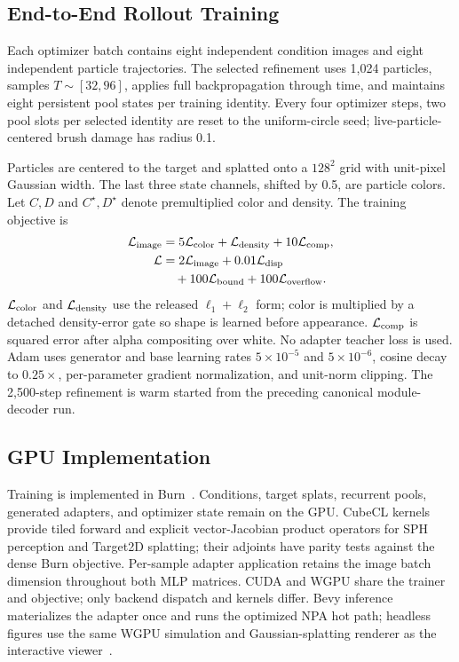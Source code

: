 \documentclass[sigconf,nonacm]{acmart}
\begin{document}
\subsection{End-to-End Rollout Training}

Each optimizer batch contains eight independent condition images and eight
independent particle trajectories. The selected refinement uses 1,024
particles, samples $T\sim[32,96]$, applies full backpropagation through time,
and maintains eight persistent pool states per training identity. Every four
optimizer steps, two pool slots per selected identity are reset to the
uniform-circle seed; live-particle-centered brush damage has radius 0.1.

Particles are centered to the target and splatted onto a $128^2$ grid with
unit-pixel Gaussian width. The last three state channels, shifted by 0.5, are
particle colors. Let $C,D$ and $C^\star,D^\star$ denote premultiplied color and
density. The training objective is
\begin{equation}
\begin{aligned}
\mathcal{L}_{\rm image}
  &=5\mathcal{L}_{\rm color}+\mathcal{L}_{\rm density}
    +10\mathcal{L}_{\rm comp},\\
\mathcal{L}
  &=2\mathcal{L}_{\rm image}+0.01\mathcal{L}_{\rm disp}\\
  &\quad+100\mathcal{L}_{\rm bound}+100\mathcal{L}_{\rm overflow}.
\end{aligned}
\label{eq:loss}
\end{equation}
$\mathcal{L}_{\rm color}$ and $\mathcal{L}_{\rm density}$ use the released
$\ell_1+\ell_2$ form; color is multiplied by a detached density-error gate so
shape is learned before appearance. $\mathcal{L}_{\rm comp}$ is squared error
after alpha compositing over white. No adapter teacher loss is used. Adam uses
generator and base learning rates $5\!\times\!10^{-5}$ and
$5\!\times\!10^{-6}$, cosine decay to $0.25\times$, per-parameter gradient
normalization, and unit-norm clipping. The 2,500-step refinement is warm
started from the preceding canonical module-decoder run.

\subsection{GPU Implementation}

Training is implemented in Burn~\cite{burnsoftware}. Conditions, target
splats, recurrent pools, generated adapters, and optimizer state remain on the
GPU. CubeCL kernels provide tiled forward and explicit vector-Jacobian product
operators for SPH perception and Target2D splatting; their adjoints have parity
tests against the dense Burn objective. Per-sample adapter application retains
the image batch dimension throughout both MLP matrices. CUDA and WGPU share
the trainer and objective; only backend dispatch and kernels differ. Bevy
inference materializes the adapter once and runs the optimized NPA hot path;
headless figures use the same WGPU simulation and Gaussian-splatting renderer
as the interactive viewer~\cite{bevysoftware,bevygaussianssoftware}.
\end{document}
